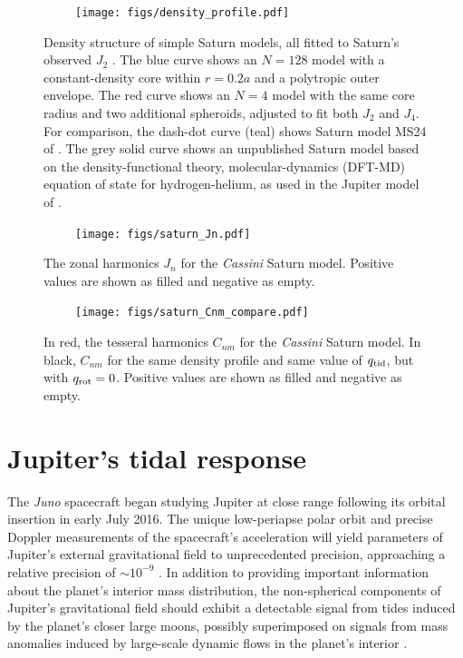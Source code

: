 \begin{figure}[h!]  
  \centering
    \texttt{[image: figs/density\_profile.pdf]} \caption{ 
Density structure of simple Saturn models, all fitted to Saturn's observed
$J_2$ \citep{Jacobson2006}.  The blue curve shows an $N=128$ model with a
constant-density core within $r=0.2 a$ and a polytropic outer envelope.  The
red curve shows an $N=4$ model with the same core radius and two additional
spheroids, adjusted to fit both $J_2$ and $J_4$.  For comparison, the dash-dot
curve (teal) shows Saturn model MS24 of \citet{gudkova1999}.  The grey solid
curve shows an unpublished Saturn model based on the density-functional theory,
molecular-dynamics (DFT-MD) equation of state for hydrogen-helium, as used in
the Jupiter model of \citet{hubbard2016}.
}
\label{fig:density_structure}
\end{figure}

\begin{figure}[h!]  
  \centering
    \texttt{[image: figs/saturn\_Jn.pdf]}
\caption{ The zonal harmonics $J_n$ for the \textit{Cassini} Saturn model. Positive
values are shown as filled and negative  as empty.}
\label{fig:saturn_zonal}
\end{figure}

\begin{figure}[h!]  
  \centering
    \texttt{[image: figs/saturn\_Cnm\_compare.pdf]}
\caption{ In red, the tesseral harmonics $C_{nm}$ for the \textit{Cassini} Saturn
model. In black, $C_{nm}$ for the same density profile and same value of $q_{\rm
tid}$, but with $q_{\rm rot}=0$. Positive values are shown as filled and negative as
empty.} \label{fig:saturn_tesseral}
\end{figure}

%

%

%



\section{Jupiter's tidal response} \label{saturn}

The \textit{Juno} spacecraft began studying Jupiter at close range following its
orbital insertion in early July 2016. The unique low-periapse polar orbit and precise
Doppler measurements of the spacecraft's acceleration will yield parameters of
Jupiter's external gravitational field to unprecedented precision, approaching a
relative precision of $\sim 10^{-9}$ \citep{kaspi2010}. In addition to providing
important information about the planet's interior mass distribution, the
non-spherical components of Jupiter's gravitational field should exhibit a detectable
signal from tides induced by the planet's closer large moons, possibly superimposed
on signals from mass anomalies induced by large-scale dynamic flows in the planet's
interior \citep{cao2015,kaspi2010,kaspi2013}.

